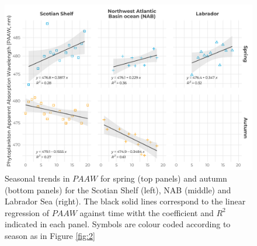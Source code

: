 \documentclass[utf8]{frontiersSCNS} %
\begin{document}
\begin{figure}[h!]
\begin{center}
\includegraphics[width=16cm]{fig09.pdf}
\end{center}
\caption{Seasonal trends in $PAAW$ for spring (top panels) and autumn (bottom panels) for the Scotian Shelf (left), NAB (middle) and Labrador Sea (right). The black solid lines correspond to the linear regression of $PAAW$ against time witht the coefficient and $R^2$ indicated in each panel. Symbols are colour coded according to season as in Figure \ref{fig:2}}\label{fig:9}
\end{figure}
\end{document}
